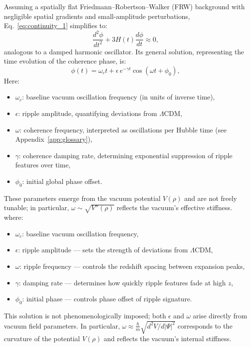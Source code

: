 Assuming a spatially flat Friedmann–Robertson–Walker (FRW) background with negligible spatial gradients and small-amplitude perturbations, Eq.~\eqref{eq:continuity_1} simplifies to:
\begin{equation}
\frac{d^2\phi}{dt^2} + 3H(t)\frac{d\phi}{dt} \approx 0,
\label{eq:phase_damping}
\end{equation}
analogous to a damped harmonic oscillator. Its general solution, representing the time evolution of the coherence phase, is:
\begin{equation}
\phi(t) = \omega_c t + \epsilon\, e^{-\gamma t}\cos(\omega t + \phi_0),
\label{eq:phi_solution}
\end{equation}
Here:
\begin{itemize}[leftmargin=*]
    \item \( \omega_c \): baseline vacuum oscillation frequency (in units of inverse time),
    \item \( \epsilon \): ripple amplitude, quantifying deviations from \(\Lambda\)CDM,
    \item \( \omega \): coherence frequency, interpreted as oscillations per Hubble time (see Appendix~\ref{app:glossary}),
    \item \( \gamma \): coherence damping rate, determining exponential suppression of ripple features over time,
    \item \( \phi_0 \): initial global phase offset.
\end{itemize}
These parameters emerge from the vacuum potential \( V(\rho) \) and are not freely tunable; in particular, \( \omega \sim \sqrt{V''(\rho)} \) reflects the vacuum's effective stiffness.
where:
\begin{itemize}[leftmargin=*]
    \item \( \omega_c \): baseline vacuum oscillation frequency,
    \item \( \epsilon \): ripple amplitude — sets the strength of deviations from \(\Lambda\)CDM,
    \item \( \omega \): ripple frequency — controls the redshift spacing between expansion peaks,
    \item \( \gamma \): damping rate — determines how quickly ripple features fade at high \( z \),
    \item \( \phi_0 \): initial phase — controls phase offset of ripple signature.
\end{itemize}

This solution is not phenomenologically imposed; both \( \epsilon \) and \( \omega \) arise directly from vacuum field parameters. In particular, \( \omega \approx \frac{\hbar}{m}\sqrt{d^2V/d|\Psi|^2} \) corresponds to the curvature of the potential \( V(\rho) \) and reflects the vacuum's internal stiffness.

